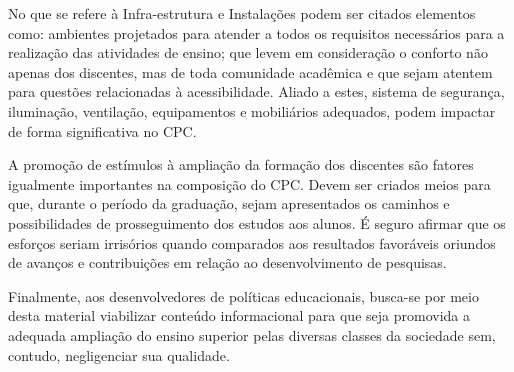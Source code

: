 No que se refere à Infra-estrutura e Instalações podem ser citados elementos como: ambientes projetados para atender a todos os requisitos necessários para a realização das atividades de ensino; que levem em consideração o conforto não apenas dos discentes, mas de toda comunidade acadêmica e que sejam atentem para questões relacionadas à acessibilidade. Aliado a estes, sistema de segurança, iluminação, ventilação, equipamentos e mobiliários adequados, podem impactar de forma significativa no CPC.

A promoção de estímulos à ampliação da formação dos discentes são fatores igualmente importantes na composição do CPC. Devem ser criados meios para que, durante o período da graduação, sejam apresentados os caminhos e possibilidades de prosseguimento dos estudos aos alunos. É seguro afirmar que os esforços seriam irrisórios quando comparados aos resultados favoráveis oriundos de avanços e contribuições em relação ao desenvolvimento de pesquisas.

Finalmente, aos desenvolvedores de políticas educacionais, busca-se por meio desta material viabilizar conteúdo informacional para que seja promovida a adequada ampliação do ensino superior pelas diversas classes da sociedade sem, contudo, negligenciar sua qualidade.